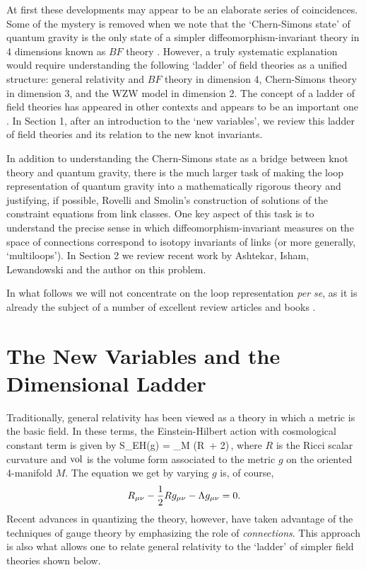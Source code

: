 At first these developments may appear to be an elaborate series of
coincidences.  Some of the mystery is removed when we note that the
`Chern-Simons state' of quantum gravity is the only state of a simpler
diffeomorphism-invariant theory in 4 dimensions known as $BF$
theory \cite{BT1,Horowitz}.  However, a truly systematic explanation would
require understanding the following `ladder' of field theories as a
unified structure: general relativity and $BF$ theory in dimension 4,
Chern-Simons theory in dimension 3, and the WZW model in dimension 2.
The concept of a ladder of field theories has appeared in other contexts
and appears to be an important one \cite{Atiyah0,TJZW}.  In Section 1,
after an introduction to the `new variables', we review this ladder of
field theories and its relation to the new knot invariants.

In addition to understanding the Chern-Simons state as a bridge between
knot theory and quantum gravity, there is the much larger task of
making the loop representation of quantum gravity into a mathematically
rigorous theory and justifying, if possible, Rovelli and Smolin's
construction of solutions of the constraint equations from link classes.
One key aspect of this task is to understand the precise sense in
which diffeomorphism-invariant measures on the space of connections
correspond to isotopy invariants of links (or more generally, `multiloops').
In Section 2 we review recent work by Ashtekar, Isham, Lewandowski and
the author \cite{AI,AL,Baez2,Baez2.5,Baez3} on this problem.

In what follows we will not concentrate on the loop representation {\it
per se}, as it is already the subject of a number of excellent review
articles \cite{Ashtekar2,Ashtekar2.5,Bruegmann,Loll,Smolin} and books
\cite{Ashtekar3}.

\section{The New Variables and the Dimensional Ladder}

Traditionally, general relativity has been viewed as a theory in
which a metric is the basic field.   In these terms,
the Einstein-Hilbert action with cosmological constant term is given by
\be        S_{EH}(g) = \int_{M} (R\, + 2\Lambda)\,\vol  ,
\label{EHaction} \ee
where $R$ is the Ricci scalar curvature and ${\rm vol}$ is the volume
form associated to the metric $g$ on the oriented 4-manifold
$M$. The equation we get by varying $g$ is, of course,
\[           R_{\mu \nu} - {1\over 2}R g_{\mu \nu} - \Lambda
g_{\mu \nu} = 0.\]
Recent advances in quantizing the theory, however, have taken advantage
of the techniques of gauge theory by emphasizing the role of {\it
connections}.  This approach is also what allows one to relate general
relativity to the `ladder' of simpler field theories shown below.

